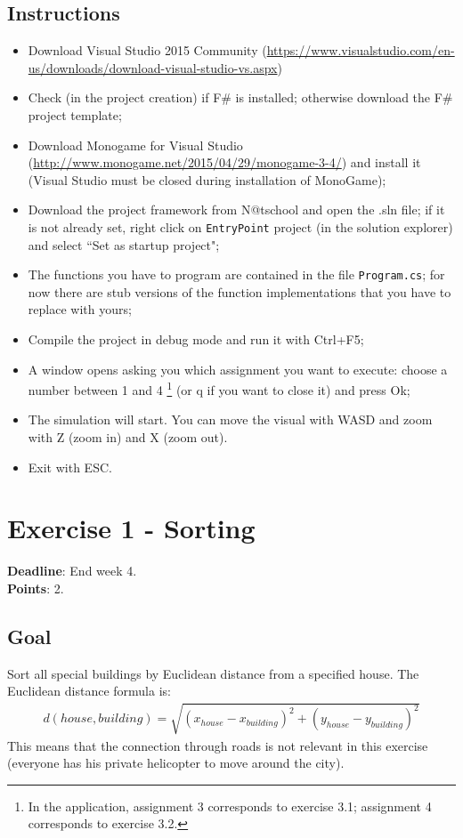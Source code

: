 \documentclass[10pt,a4paper]{article}
\begin{document}
\subsection*{Instructions}
\begin{itemize}[noitemsep]
\item Download Visual Studio 2015 Community (\url{https://www.visualstudio.com/en-us/downloads/download-visual-studio-vs.aspx}) 
\item Check (in the project creation) if F\# is installed; otherwise download the F\# project template;
\item Download Monogame for Visual Studio (\url{http://www.monogame.net/2015/04/29/monogame-3-4/}) and install it (Visual Studio must be closed during installation of MonoGame);
\item Download the project framework from N@tschool and open the .sln file; if it is not already set, right click on \texttt{EntryPoint} project (in the solution explorer) and select ``Set as startup project";
\item The functions you have to program are contained in the file \texttt{Program.cs}; for now there are stub versions of the function implementations that you have to replace with yours;
\item Compile the project in debug mode and run it with Ctrl+F5;
\item A window opens asking you which assignment you want to execute: choose a number between 1 and 4 \footnote{In the application, assignment 3 corresponds to exercise 3.1; assignment 4 corresponds to exercise 3.2.} (or q if you want to close it) and press Ok;
\item The simulation will start. You can move the visual with WASD and zoom with Z (zoom in) and X (zoom out).
\item Exit with ESC. 
\end{itemize}

\section*{Exercise 1 - Sorting}

\textbf{Deadline}: End week 4. \\
\textbf{Points}: 2.

\subsection*{Goal}
Sort all special buildings by Euclidean distance from a specified house. The Euclidean distance formula is:
\begin{align*}
d(house,building) = \sqrt{(x_{house} - x_{building})^{2} + (y_{house} - y_{building})^{2} } 
\end{align*}
This means that the connection through roads is not relevant in this exercise (everyone has his private helicopter to move around the city).
\end{document}
